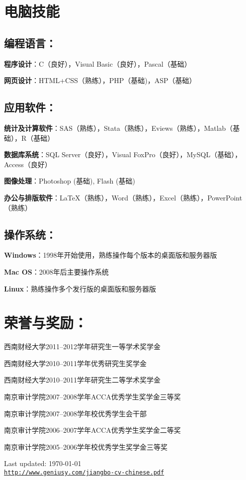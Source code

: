 \documentclass[a4paper]{article}
\def\footerlink{http://www.geniusy.com/jiangbo-cv-chinese.pdf}
\renewenvironment{itemize}{
  \begin{list}{}{
    \setlength{\leftmargin}{1.5em}
    \setlength{\itemsep}{0pt}
  }
}{
  \end{list}
}
\begin{document}
\section*{电脑技能}
\subsection*{编程语言：}
\begin{itemize}
\item {\bfseries 程序设计}：C（良好），Visual Basic（良好），Pascal（基础）
\item {\bfseries 网页设计}：HTML+CSS（熟练），PHP（基础)，ASP（基础）
\end{itemize}

\subsection*{应用软件：}
\begin{itemize}
\item {\bfseries 统计及计算软件}：SAS（熟练），Stata（熟练），Eviews（熟练），Matlab（基础），R（基础）
\item {\bfseries 数据库系统}：SQL Server（良好），Visual FoxPro（良好），MySQL（基础），Access（良好）
\item {\bfseries 图像处理}：Photoshop (基础), Flash (基础)
\item {\bfseries 办公与排版软件}：\LaTeX （熟练），Word（熟练），Excel（熟练），PowerPoint（熟练）
\end{itemize}

\subsection*{操作系统：}
\begin{itemize}
\item {\bfseries Windows}：1998年开始使用，熟练操作每个版本的桌面版和服务器版
\item {\bfseries Mac OS}：2008年后主要操作系统
\item {\bfseries Linux}：熟练操作多个发行版的桌面版和服务器版
\end{itemize}

\section*{荣誉与奖励：}
\begin{itemize}
\item 西南财经大学2011--2012学年研究生一等学术奖学金
\item 西南财经大学2010--2011学年优秀研究生奖学金
\item 西南财经大学2010--2011学年研究生二等学术奖学金
\item 南京审计学院2007--2008学年ACCA优秀学生奖学金三等奖
\item 南京审计学院2007--2008学年校优秀学生会干部
\item 南京审计学院2006--2007学年ACCA优秀学生奖学金二等奖
\item 南京审计学院2005--2006学年校优秀学生奖学金三等奖
\end{itemize}

\bigskip

\begin{center}
  \begin{footnotesize}
    Last updated: \today \\
    \href{\footerlink}{\texttt{\footerlink}}
  \end{footnotesize}
\end{center}
\end{document}
